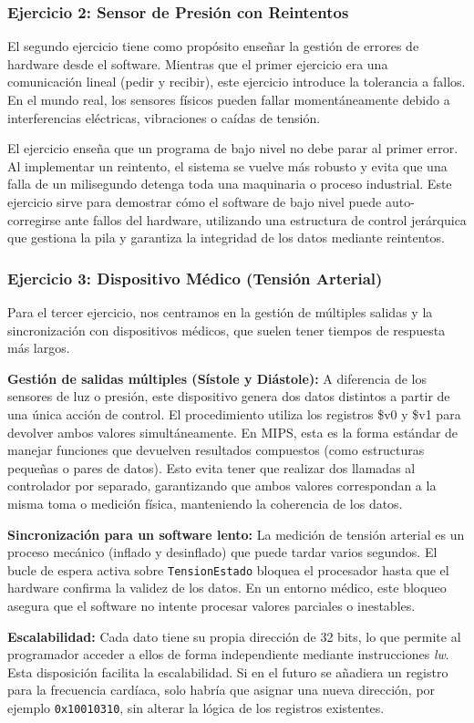 \documentclass[12pt]{article}
\begin{document}
\subsubsection*{Ejercicio 2: Sensor de Presión con Reintentos}

El segundo ejercicio tiene como propósito enseñar la gestión de errores de hardware desde el software. Mientras que el primer ejercicio era una comunicación lineal (pedir y recibir), este ejercicio introduce la tolerancia a fallos. En el mundo real, los sensores físicos pueden fallar momentáneamente debido a interferencias eléctricas, vibraciones o caídas de tensión. 

El ejercicio enseña que un programa de bajo nivel no debe parar al primer error. Al implementar un reintento, el sistema se vuelve más robusto y evita que una falla de un milisegundo detenga toda una maquinaria o proceso industrial. Este ejercicio sirve para demostrar cómo el software de bajo nivel puede auto-corregirse ante fallos del hardware, utilizando una estructura de control jerárquica que gestiona la pila y garantiza la integridad de los datos mediante reintentos.

\subsubsection*{Ejercicio 3: Dispositivo Médico (Tensión Arterial)}

Para el tercer ejercicio, nos centramos en la gestión de múltiples salidas y la sincronización con dispositivos médicos, que suelen tener tiempos de respuesta más largos.

\textbf{Gestión de salidas múltiples (Sístole y Diástole):} A diferencia de los sensores de luz o presión, este dispositivo genera dos datos distintos a partir de una única acción de control. El procedimiento utiliza los registros \$v0 y \$v1 para devolver ambos valores simultáneamente. En MIPS, esta es la forma estándar de manejar funciones que devuelven resultados compuestos (como estructuras pequeñas o pares de datos). Esto evita tener que realizar dos llamadas al controlador por separado, garantizando que ambos valores correspondan a la misma toma o medición física, manteniendo la coherencia de los datos.

\textbf{Sincronización para un software lento:} La medición de tensión arterial es un proceso mecánico (inflado y desinflado) que puede tardar varios segundos. El bucle de espera activa sobre \texttt{TensionEstado} bloquea el procesador hasta que el hardware confirma la validez de los datos. En un entorno médico, este bloqueo asegura que el software no intente procesar valores parciales o inestables.

\textbf{Escalabilidad:} Cada dato tiene su propia dirección de 32 bits, lo que permite al programador acceder a ellos de forma independiente mediante instrucciones \textit{lw}. Esta disposición facilita la escalabilidad. Si en el futuro se añadiera un registro para la frecuencia cardíaca, solo habría que asignar una nueva dirección, por ejemplo \texttt{0x10010310}, sin alterar la lógica de los registros existentes.
\end{document}

